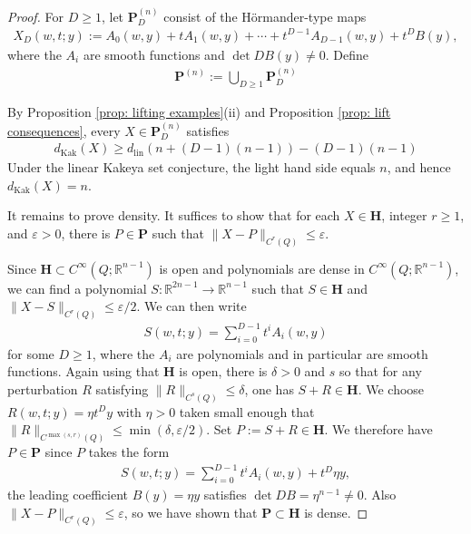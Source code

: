 \documentclass[reqno,11pt]{amsart}
\numberwithin{equation}{section}
\numberwithin{figure}{section}
\def\R{\mathbb{R}}
\def\eps{\varepsilon}
\renewcommand\leq{\leqslant}
\renewcommand\geq{\geqslant}
\theoremstyle{plain}
\theoremstyle{definition}
\newcommand{\Kak}{\mathrm{Kak}}
\newcommand{\lin}{\mathrm{lin}}
\begin{document}
    \begin{proof}

    For $D \geq 1$, let $\mathbf P_D^{(n)}$ consist of the H\"ormander-type maps 
    \begin{align}
                X_D(w,t;y) := A_0(w,y) + tA_1(w,y) + \cdots + t^{D-1} A_{D-1}(w,y) + t^D B(y),
    \end{align}
    where the $A_i$ are smooth functions and $\det DB(y) \neq 0$. Define 
    \begin{align}
        \mathbf P^{(n)} := \bigcup_{D \geq 1} \mathbf P^{(n)}_D
    \end{align}

    By Proposition \ref{prop: lifting examples}(ii) and Proposition \ref{prop: lift consequences},
    every $X \in \mathbf P_D^{(n)}$ satisfies 
    \begin{align}
        d_{\Kak}(X) \geq d_{\lin}(n + (D-1)(n-1)) - (D-1)(n-1)
    \end{align}
    Under the linear Kakeya set conjecture, the light hand side equals $n$, and hence $d_\Kak(X) = n$. 
    
    It remains to prove density. It suffices to show that for each $X \in \mathbf H$, integer $r \geq 1$, and $\eps > 0$, there is $P \in \mathbf P$ such that 
    $\|X-P\|_{C^r(Q)} \leq \eps$. 
    
    Since $\mathbf H \subset C^\infty(Q ; \R^{n-1})$ is open and polynomials are dense in $C^\infty(Q ; \R^{n-1})$, we can find a polynomial $S : \R^{2n-1} \to \R^{n-1}$ such that $S \in \mathbf H$ and 
    $\|X-S\|_{C^r(Q)} \leq \eps/2$. We can then write
    \begin{align}
        S(w,t;y) = \sum_{i=0}^{D-1} t^i A_i(w,y)
    \end{align}
    for some $D \geq 1$, where the $A_i$ are polynomials and in particular are smooth functions. Again using that $\mathbf H$ is open, there is $\delta >0$ and $s$ so that for any perturbation $R$ satisfying $\|R\|_{C^s(Q)} \leq \delta$, one has $S + R \in \mathbf H$. We choose $R(w,t;y) = \eta t^{D} y$ with $\eta > 0$ taken small enough that $\|R\|_{C^{\max(s,r)}(Q)} \leq \min(\delta, \eps/2)$. Set $P := S + R \in \mathbf H$. We therefore have $P \in \mathbf P$ since $P$ takes the form
    \begin{align}
        S(w,t;y) = \sum_{i=0}^{D-1} t^i A_i(w,y) + t^D \eta y,
    \end{align}
    the leading coefficient $B(y) = \eta y$ satisfies $\det DB = \eta^{n-1} \neq 0$. Also $\|X-P\|_{C^r(Q)} \leq \eps$, so we have shown that $\mathbf P \subset \mathbf H$ is dense. 

    \end{proof}
    
\end{document}
